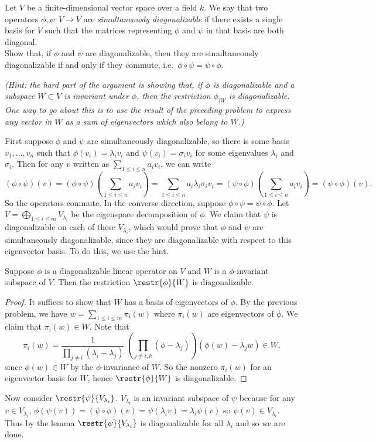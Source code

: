 \begin{problem}
Let $V$ be a finite-dimensional vector space over a field $k$. We say that two operators $\phi,\psi:V\to V$ are {\em simultaneously diagonalizable} if there exists a single basis for $V$ such that the matrices representing $\phi$ and $\psi$ in that basis are both diagonal.\\

Show that, if $\phi$ and $\psi$ are diagonalizable, then they are simultaneously diagonalizable if and only if they commute, i.e.\ $\phi\circ \psi = \psi \circ \phi$.
\end{problem}
\textit{(Hint: the hard part of the argument is showing that, if $\phi$ is diagonalizable and a subspace $W\subset V$ is invariant under $\phi$, then the restriction $\phi_{|W}$ is diagonalizable. One way to go about this is to use the result of the preceding problem to express any vector in $W$ as a sum of eigenvectors which also belong to $W$.)}

First suppose $\phi$ and $\psi$ are simultaneously diagonalizable, so there is some basis $v_1,\ldots, v_n$ such that $\phi(v_i)=\lambda_iv_i$ and $\psi(v_i)=\sigma_iv_i$ for some eigenvalues $\lambda_i$ and $\sigma_i$. Then for any $v$ written as $\sum_{1\leq i\leq n}a_iv_i$, we can write  
\[
  (\phi\circ\psi)(v)=\left(\phi\circ\psi\right)\left(\sum_{1\leq i\leq n}a_iv_i\right)=\sum_{1\leq i\leq n}a_i\lambda_i\sigma_i v_i=\left(\psi\circ\phi\right)\left(\sum_{1\leq i\leq n}a_iv_i\right)=(\psi\circ\phi)(v)
.\]
So the operators commute. In the converse direction, suppose $\phi\circ\psi=\psi\circ\phi$. Let $V=\bigoplus_{1\leq i \leq m}V_{\lambda_i}$ be the eigenspace decomposition of $\phi$. We claim that $\psi$ is diagonalizable on each of these $V_{\lambda_i}$, which would prove that $\phi$ and $\psi$ are simultaneously diagonalizable, since they are diagonalizable with respect to this eigenvector basis. To do this, we use the hint.               

\begin{lemma}[Hint]
  Suppose $\phi$ is a diagonalizable linear operator on $V$ and $W$ is a $\phi$-invariant subspace of $V$. Then the restriction $\restr{\phi}{W}$ is diagonalizable.  
\end{lemma}
\begin{proof}
  It suffices to show that $W$ has a basis of eigenvectors of $\phi$. By the previous problem, we have $w=\sum_{1\leq i \leq m}\pi_i(w)$ where $\pi_i(w)$ are eigenvectors of $\phi$. We claim that $\pi_i(w)\in W$. Note that 
  \[
    \pi_i(w)=\frac{1}{\prod_{j\neq i}(\lambda_i-\lambda_j)}\,\left(\prod_{j\neq i,k} (\phi-\lambda_j)\right)(\phi(w)-\lambda_jw)\in W
  ,\] 
  since $\phi(w)\in W$ by the $\phi$-invariance of $W$. So the nonzero $\pi_i(w)$ for an eigenvector basis for $W$, hence $\restr{\phi}{W}$ is diagonalizable.   
\end{proof}

Now consider $\restr{\psi}{V_{\lambda_i}}$. $V_{\lambda_i}$ is an invariant subspace of $\psi$ because for any $v\in V_{\lambda_i}$, $\phi(\psi(v))=(\psi\circ\phi)(v)=\psi(\lambda_iv)=\lambda_i\psi(v)$ so $\psi(v)\in V_{\lambda_i}$. Thus by the lemma $\restr{\psi}{V_{\lambda_i}}$ is diagonalizable for all $\lambda_i$ and so we are done.  